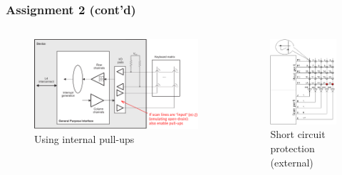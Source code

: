 \begin{frame}
  \frametitle{Assignment 2 (cont'd)}
  \vspace*{-5mm}
  \begin{columns}
      \begin{figure}
        \centering
        \includegraphics[scale=0.23]{images/keypad-scan2.png}
        \caption{Using internal pull-ups}
      \end{figure}
      \begin{figure}
        \centering
        \includegraphics[scale=0.4]{images/keypad-scan1.png}
        \caption{Short circuit protection (external)}
      \end{figure}
  \end{columns}
  \vspace*{-10mm}
\end{frame}

